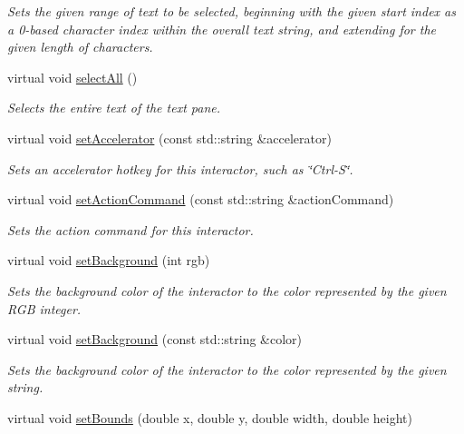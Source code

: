 \begin{DoxyCompactItemize}
\begin{DoxyCompactList}\small\item\em Sets the given range of text to be selected, beginning with the given start index as a 0-\/based character index within the overall text string, and extending for the given length of characters. \end{DoxyCompactList}\item 
virtual void \mbox{\hyperlink{classGBrowserPane_ab6658ed404200bd7aaca5629db064645}{select\+All}} ()
\begin{DoxyCompactList}\small\item\em Selects the entire text of the text pane. \end{DoxyCompactList}\item 
virtual void \mbox{\hyperlink{classGInteractor_ad15f102f62e2960576012f1aa0ba4b2e}{set\+Accelerator}} (const std\+::string \&accelerator)
\begin{DoxyCompactList}\small\item\em Sets an accelerator hotkey for this interactor, such as \char`\"{}\+Ctrl-\/\+S\char`\"{}. \end{DoxyCompactList}\item 
virtual void \mbox{\hyperlink{classGInteractor_a4b5843fe3030e038a1ba54cc03389bcf}{set\+Action\+Command}} (const std\+::string \&action\+Command)
\begin{DoxyCompactList}\small\item\em Sets the action command for this interactor. \end{DoxyCompactList}\item 
virtual void \mbox{\hyperlink{classGInteractor_acba7e546c2025c0a15ca4b4cc92043db}{set\+Background}} (int rgb)
\begin{DoxyCompactList}\small\item\em Sets the background color of the interactor to the color represented by the given R\+GB integer. \end{DoxyCompactList}\item 
virtual void \mbox{\hyperlink{classGInteractor_ab4677ab2474e68b07aa56605af92a84a}{set\+Background}} (const std\+::string \&color)
\begin{DoxyCompactList}\small\item\em Sets the background color of the interactor to the color represented by the given string. \end{DoxyCompactList}\item 
virtual void \mbox{\hyperlink{classGInteractor_a2aae8197624b72265ab83b4f1bc73f2f}{set\+Bounds}} (double x, double y, double width, double height)

\end{DoxyCompactItemize}

